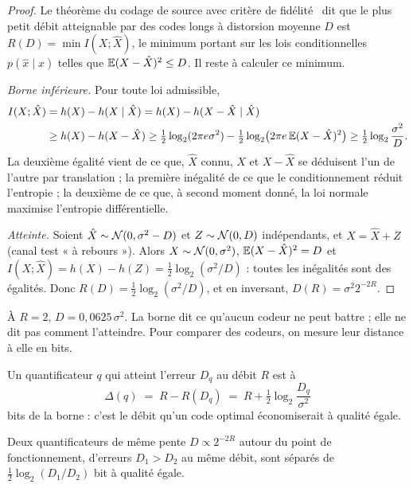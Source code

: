 \begin{proof}
Le théorème du codage de source avec critère de fidélité~\cite{shannon1959} dit que le plus petit débit atteignable par des codes longs à distorsion moyenne $D$ est $R(D) = \min I(X; \hat X)$, le minimum portant sur les lois conditionnelles $p(\hat x \mid x)$ telles que $\mathbb{E}(X - \hat X)^2 \le D$. Il reste à calculer ce minimum.

\emph{Borne inférieure.} Pour toute loi admissible,
\begin{align*}
I(X; \hat X) &= h(X) - h(X \mid \hat X) = h(X) - h(X - \hat X \mid \hat X) \\
&\ge h(X) - h(X - \hat X) \ge \tfrac12 \log_2(2\pi e \sigma^2) - \tfrac12 \log_2\bigl(2\pi e\, \mathbb{E}(X-\hat X)^2\bigr) \ge \tfrac12 \log_2 \frac{\sigma^2}{D}.
\end{align*}
La deuxième égalité vient de ce que, $\hat X$ connu, $X$ et $X - \hat X$ se déduisent l'un de l'autre par translation ; la première inégalité de ce que le conditionnement réduit l'entropie ; la deuxième de ce que, à second moment donné, la loi normale maximise l'entropie différentielle.

\emph{Atteinte.} Soient $\hat X \sim \mathcal{N}(0, \sigma^2 - D)$ et $Z \sim \mathcal{N}(0, D)$ indépendants, et $X = \hat X + Z$ (canal test « à rebours »). Alors $X \sim \mathcal{N}(0,\sigma^2)$, $\mathbb{E}(X - \hat X)^2 = D$ et $I(X;\hat X) = h(X) - h(Z) = \tfrac12\log_2(\sigma^2/D)$ : toutes les inégalités sont des égalités. Donc $R(D) = \tfrac12\log_2(\sigma^2/D)$, et en inversant, $D(R) = \sigma^2 2^{-2R}$.
\end{proof}

À $R = 2$, $D = 0{,}0625\,\sigma^2$. La borne dit ce qu'aucun codeur ne peut battre ; elle ne dit pas comment l'atteindre. Pour comparer des codeurs, on mesure leur distance à elle en bits.

\begin{definition}\label{def:distance}
Un quantificateur $q$ qui atteint l'erreur $D_q$ au débit $R$ est à
\[
\Delta(q) \;=\; R - R(D_q) \;=\; R + \tfrac12 \log_2 \frac{D_q}{\sigma^2}
\]
bits de la borne : c'est le débit qu'un code optimal économiserait à qualité égale.
\end{definition}

\begin{lemme}\label{lem:rapport-bits}
Deux quantificateurs de même pente $D \propto 2^{-2R}$ autour du point de fonctionnement, d'erreurs $D_1 > D_2$ au même débit, sont séparés de $\tfrac12 \log_2(D_1/D_2)$ bit à qualité égale.
\end{lemme}

